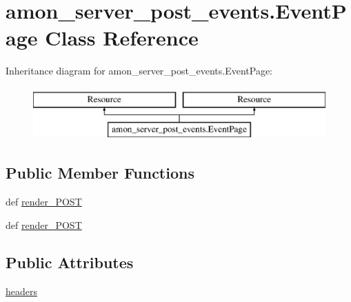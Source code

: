 \hypertarget{classamon__server__post__events_1_1_event_page}{\section{amon\-\_\-server\-\_\-post\-\_\-events.\-Event\-Page Class Reference}
\label{classamon__server__post__events_1_1_event_page}
}
Inheritance diagram for amon\-\_\-server\-\_\-post\-\_\-events.\-Event\-Page\-:\begin{figure}[H]
\begin{center}
\leavevmode
\includegraphics[height=2.000000cm]{classamon__server__post__events_1_1_event_page}
\end{center}
\end{figure}
\subsection*{Public Member Functions}
\begin{DoxyCompactItemize}
\item 
def \hyperlink{classamon__server__post__events_1_1_event_page_a6a13fe43aa7636c1ab259755ef49f12c}{render\-\_\-\-P\-O\-S\-T}
\item 
def \hyperlink{classamon__server__post__events_1_1_event_page_a6a13fe43aa7636c1ab259755ef49f12c}{render\-\_\-\-P\-O\-S\-T}
\end{DoxyCompactItemize}
\subsection*{Public Attributes}
\begin{DoxyCompactItemize}
\item 
\hyperlink{classamon__server__post__events_1_1_event_page_a3162cfad0f10a6d57039b849c2b2c89e}{headers}
\end{DoxyCompactItemize}
